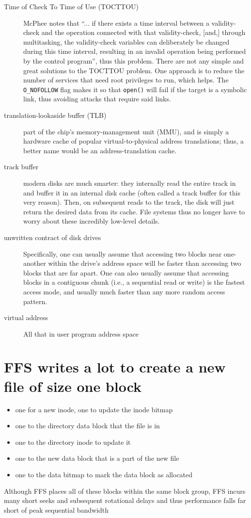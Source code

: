 \begin{description}
\item[Time of Check To Time of Use (TOCTTOU)] McPhee notes that ``... if there exists a time interval between a validity-check and the operation connected with that validity-check, [and,] through multitasking, the validity-check variables can deliberately be changed during this time interval, resulting in an invalid operation being performed by the control program'', thus this problem.  There are not any simple and great solutions to the TOCTTOU problem. One approach is to reduce the number of services that need root privileges to run, which helps. The \texttt{O\_NOFOLLOW} flag makes it so that \texttt{open()} will fail if the target is a symbolic link, thus avoiding attacks that require said links.

\item[translation-lookaside buffer (TLB)] part of the chip’s memory-management unit (MMU), and is simply a hardware cache of popular virtual-to-physical address translations; thus, a better name would be an address-translation cache.

\item[track buffer] modern disks are much smarter: they internally read the entire track in and buffer it in an internal disk cache (often called a track buffer for this very reason). Then, on subsequent reads to the track, the disk will just return the desired data from its cache. File systems thus no longer have to worry about these incredibly low-level details.


\item[unwritten contract of disk drives] Specifically, one can usually assume that accessing two blocks near one-another within the drive’s address space will be faster than accessing two blocks that are far apart. One can also usually assume that accessing blocks in a contiguous chunk (i.e., a sequential read or write) is the fastest access mode, and usually much faster than any more random access pattern.

\item[virtual address] All that in user program address space

\end{description}
\section*{FFS writes a lot to create a new file of size one block}
\begin{itemize}
\item one for a new inode, one to update the inode bitmap
\item one to the directory data block that the file is in
\item one to the directory inode to update it
\item one to the new data block that is a part of the new file
\item one to the data bitmap to mark the data block as allocated
\end{itemize}
Although FFS places all of these blocks within the same block group, FFS incurs many short seeks and subsequent rotational delays and thus performance falls far short of peak sequential bandwidth

